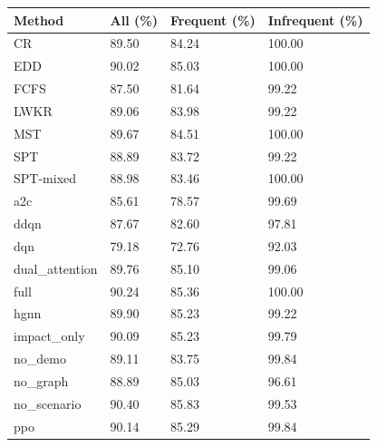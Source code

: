 \begin{tabular}{llll}
\toprule
Method & All (\%) & Frequent (\%) & Infrequent (\%)\\
\midrule
CR & 89.50 & 84.24 & 100.00\\
EDD & 90.02 & 85.03 & 100.00\\
FCFS & 87.50 & 81.64 & 99.22\\
LWKR & 89.06 & 83.98 & 99.22\\
MST & 89.67 & 84.51 & 100.00\\
SPT & 88.89 & 83.72 & 99.22\\
SPT-mixed & 88.98 & 83.46 & 100.00\\
a2c & 85.61 & 78.57 & 99.69\\
ddqn & 87.67 & 82.60 & 97.81\\
dqn & 79.18 & 72.76 & 92.03\\
dual\_attention & 89.76 & 85.10 & 99.06\\
full & 90.24 & 85.36 & 100.00\\
hgnn & 89.90 & 85.23 & 99.22\\
impact\_only & 90.09 & 85.23 & 99.79\\
no\_demo & 89.11 & 83.75 & 99.84\\
no\_graph & 88.89 & 85.03 & 96.61\\
no\_scenario & 90.40 & 85.83 & 99.53\\
ppo & 90.14 & 85.29 & 99.84\\
\bottomrule
\end{tabular}